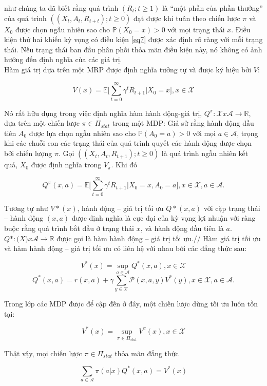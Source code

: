 \documentclass[14pt,a4paper,oneside]{report}		%
\begin{document}
như chúng ta đã biết rằng quá trình $(R_t ; t\geq 1)$ là “một phần của phần thưởng” của quá trình $((X_t,A_t,R_{t+t});t\geq 0)$ đạt được khi tuân theo chiến lược $\pi$ và $X_0$ được chọn ngẫu nhiên sao cho $\mathbb{P}(X_0=x)>0$ với mọi trạng thái $x$. Điều kiện thứ hai khiến kỳ vọng có điều kiện \ref{eq7} được xác định rõ ràng với mỗi trạng thái. Nếu trạng thái ban đầu phân phối thỏa mãn điều kiện này, nó không có ảnh hưởng đến định nghĩa của các giá trị.\\
Hàm giá trị dựa trên một MRP được định nghĩa tưởng tự và được ký hiệu bởi $V$:

$$V(x)=\mathbb{E}\bigg[\displaystyle\sum^\infty_{t=0}{\gamma^tR_{t+1}|X_0=x}\bigg], x\in\mathcal{X}$$

Nó rất hữu dụng trong việc định nghĩa hàm hành động-giá trị, $Q^\pi:\mathcal{X}x\mathcal{A}\rightarrow\mathbb{R}$, dựa trên một chiến lược $\pi\in\Pi_{stat}$ trong một MDP: Giả sử rằng hành động đầu tiên $A_0$ được lựa chọn ngẫu nhiên sao cho $\mathbb{P}(A_0=a)>0$ với mọi $a\in\mathcal{A}$, trọng khi các chuỗi con các trạng thái của quá trình quyết các hành động được chọn bởi chiến lượng $\pi$. Gọi $((X_t,A_t,R_{t+1});t\geq0)$ là quá trình ngẫu nhiên kết quả, $X_0$ được định nghĩa trong $V_\pi$. Khi đó

$$Q^\pi(x,a) =\mathbb{E}\bigg[\displaystyle\sum^\infty_{t=0}{\gamma^tR_{t+1}|X_0=x,A_0=a}\bigg], x\in\mathcal{X}, a\in\mathcal{A}.$$

Tương tự như $V*(x)$, hành động – giá trị tối ưu $Q*(x,a)$ với cặp trạng thái – hành động $(x,a)$ được định nghĩa là cực đại của kỳ vọng lợi nhuận với ràng buộc rằng quá trình bắt đầu ở trạng thái $x$, và hành động đầu tiên là $a$. $Q*:\mathcal(X)x\mathcal{A}\rightarrow\mathbb{R}$ được gọi là hàm hành động – giá trị tối ưu.//
Hàm giá trị tối ưu và hàm hành động – giá trị tối ưu có liên hệ với nhau bởi các đẳng thức sau:

$$V^*(x) = \displaystyle\sup_{a\in\mathcal{A}} Q^*(x,a),  x\in\mathcal{X}$$
$$Q^*(x,a) = r(x,a) + \gamma \displaystyle\sum_{y\in\mathcal{X}}{\mathcal{P}(x,a,y)V^*(y)}, x\in\mathcal{X}, a\in\mathcal{A}.$$

Trong lớp các MDP được để cập đến ở đây, một chiến lược dừng tối ưu luôn tồn tại:

$$V^*(x) = \displaystyle\sup_{\pi\in\Pi_{stat}} V^\pi(x),  x\in\mathcal{X}$$

Thật vậy, mọi chiến lược $\pi\in\Pi_{stat}$ thỏa mãn đẳng thức

\begin{equation} \label{eq8}
\sum_{a\in\mathcal{A}}{\pi (a|x)Q^*(x,a)} = V^*(x)
\end{equation}
\end{document}
